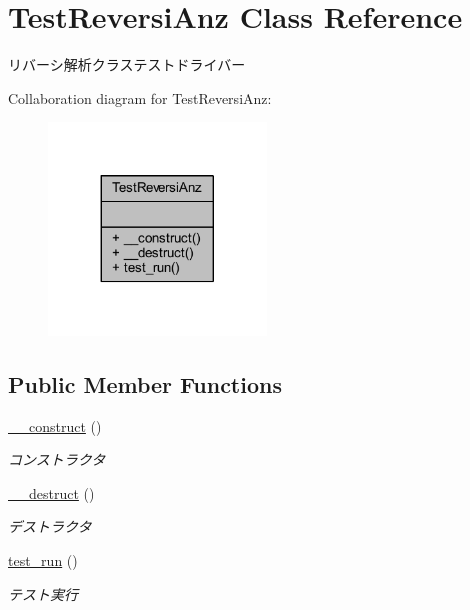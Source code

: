 \hypertarget{class_test_reversi_anz}{}\section{Test\+Reversi\+Anz Class Reference}
\label{class_test_reversi_anz}


リバーシ解析クラステストドライバー  




Collaboration diagram for Test\+Reversi\+Anz\+:
\nopagebreak
\begin{figure}[H]
\begin{center}
\leavevmode
\includegraphics[width=164pt]{class_test_reversi_anz__coll__graph}
\end{center}
\end{figure}
\subsection*{Public Member Functions}
\begin{DoxyCompactItemize}
\item 
\hyperlink{class_test_reversi_anz_a095c5d389db211932136b53f25f39685}{\+\_\+\+\_\+construct} ()
\begin{DoxyCompactList}\small\item\em コンストラクタ \end{DoxyCompactList}\item 
\hyperlink{class_test_reversi_anz_a421831a265621325e1fdd19aace0c758}{\+\_\+\+\_\+destruct} ()
\begin{DoxyCompactList}\small\item\em デストラクタ \end{DoxyCompactList}\item 
\hyperlink{class_test_reversi_anz_a9b029832cfdf19c0ef36b1f5ef7b7735}{test\+\_\+run} ()
\begin{DoxyCompactList}\small\item\em テスト実行 \end{DoxyCompactList}\end{DoxyCompactItemize}


